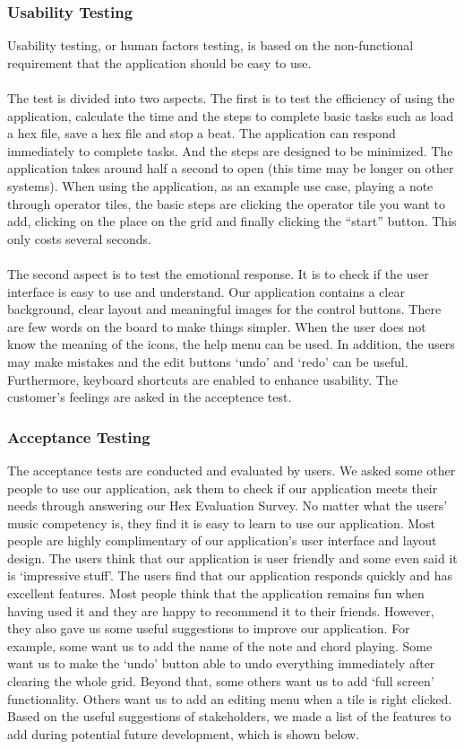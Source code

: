 \documentclass[10pt,a4paper]{article}
\begin{document}
\subsubsection{Usability Testing}
Usability testing, or human factors testing, is based on the non-functional requirement that the application should be easy to use.\\
\\
The test is divided into two aspects. The first is to test the efficiency of using the application, calculate the time and the steps to complete basic tasks such as load a hex file, save a hex file and stop a beat. The application can respond immediately to complete tasks. And the steps are designed to be minimized. The application takes around half a second to open (this time may be longer on other systems). When using the application, as an example use case, playing a note through operator tiles, the basic steps are clicking the operator tile you want to add, clicking on the place on the grid and finally clicking the “start” button. This only costs several seconds.\\
\\
The second aspect is to test the emotional response. It is to check if the user interface is easy to use and understand. Our application contains a clear background, clear layout and meaningful images for the control buttons. There are few words on the board to make things simpler. When the user does not know the meaning of the icons, the help menu can be used. In addition, the users may make mistakes and the edit buttons ‘undo’ and ‘redo’ can be useful. Furthermore, keyboard shortcuts are enabled to enhance usability. The customer's feelings are asked in the acceptence test. 

\subsubsection{Acceptance Testing}
The acceptance tests are conducted and evaluated by users. We asked some other people to use our application, ask them to check if our application meets their needs through answering our Hex Evaluation Survey. No matter what the users' music competency is, they find it is easy to learn to use our application. Most people are highly complimentary of our application's user interface and layout design. The users think that our application is user friendly and some even said it is ‘impressive stuff’\cite{edgeorge}. The users find that our application responds quickly and has excellent features. Most people think that the application remains fun when having used it and they are happy to recommend it to their friends. However, they also gave us some useful suggestions to improve our application. For example, some want us to add the name of the note and chord playing. Some want us to make the ‘undo’ button able to undo everything immediately after clearing the whole grid. Beyond that, some others want us to add ‘full screen’ functionality. Others want us to add an editing menu when a tile is right clicked. Based on the useful suggestions of stakeholders, we made a list of the features to add during potential future development, which is shown below.
\end{document}
